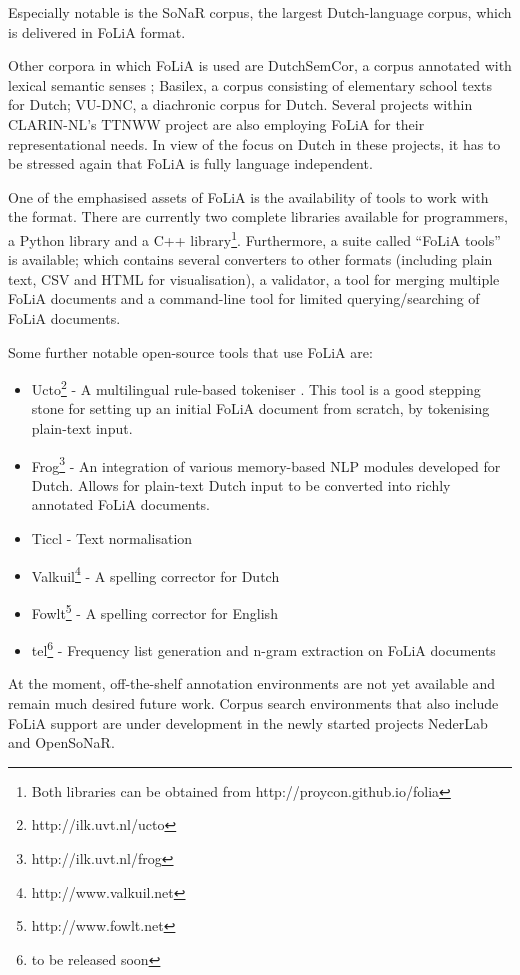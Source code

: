 \documentclass[a4paper,10pt,twoside]{article}
\begin{document}
Especially notable is the SoNaR corpus, the largest Dutch-language corpus,
which is delivered in FoLiA format. 

Other corpora in which FoLiA is used are DutchSemCor, a corpus annotated with
lexical semantic senses \cite{DUTCHSEMCOR}; Basilex, a corpus consisting of elementary school
texts for Dutch; VU-DNC, a diachronic corpus for Dutch. Several projects within CLARIN-NL's TTNWW project are also
employing FoLiA for their representational needs. In view of the focus on Dutch
in these projects, it has to be stressed again that FoLiA is fully language independent.

One of the emphasised assets of FoLiA is the availability of tools to work with the
format. There are currently two complete libraries available for programmers, a Python
library and a C++ library\footnote{Both libraries can be obtained from
http://proycon.github.io/folia}. Furthermore, a suite called ``FoLiA tools'' is
available; which contains several converters to other formats (including plain
text, CSV and HTML for visualisation), a validator, a tool for merging
multiple FoLiA documents and a command-line tool for limited querying/searching of FoLiA documents.

Some further notable open-source tools that use FoLiA are:

\begin{itemize}
  \item Ucto\footnote{http://ilk.uvt.nl/ucto} - A multilingual rule-based
    tokeniser \cite{UCTO}. This tool is a good stepping stone for setting up an initial
    FoLiA document from scratch, by tokenising plain-text input.
 \item Frog\footnote{http://ilk.uvt.nl/frog} - An integration of various memory-based NLP modules developed for
  Dutch. Allows for plain-text Dutch input to be converted into richly
  annotated FoLiA documents.
 \item Ticcl - Text normalisation  %
 \item Valkuil\footnote{http://www.valkuil.net} - A spelling corrector for Dutch
 \item Fowlt\footnote{http://www.fowlt.net} - A spelling corrector for English
 \item tel\footnote{to be released soon} - Frequency list generation and n-gram
   extraction on FoLiA documents
\end{itemize}

At the moment, off-the-shelf annotation environments are not yet available and
remain much desired future work. Corpus search environments that also include
FoLiA support are under development in the newly started projects NederLab and
OpenSoNaR. %
\end{document}
